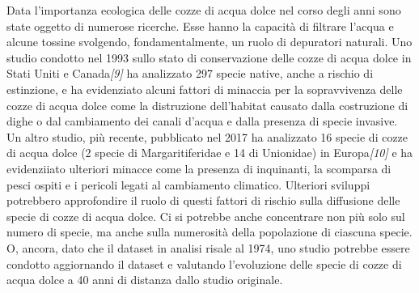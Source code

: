 \documentclass{article} %
\begin{document}
Data l'importanza ecologica delle cozze di acqua dolce nel corso degli anni sono state oggetto di numerose ricerche.
Esse hanno la capacità di filtrare l'acqua e alcune tossine svolgendo, fondamentalmente, un ruolo di depuratori naturali.
Uno studio condotto nel 1993 sullo stato di conservazione delle cozze di acqua dolce in Stati Uniti e Canada\textit{[9]} ha analizzato 297 specie native, anche a rischio di estinzione, e ha evidenziato alcuni fattori di minaccia per la sopravvivenza delle cozze di acqua dolce come la distruzione dell'habitat causato dalla costruzione di dighe o dal cambiamento dei canali d'acqua e dalla presenza di specie invasive.
Un altro studio, più recente, pubblicato nel 2017 ha analizzato 16 specie di cozze di acqua dolce (2 specie di Margaritiferidae e 14 di Unionidae) in Europa\textit{[10]} e ha evidenziiato ulteriori minacce come la presenza di inquinanti, la scomparsa di pesci ospiti e i pericoli legati al cambiamento climatico. 
Ulteriori sviluppi potrebbero approfondire il ruolo di questi fattori di rischio sulla diffusione delle specie di cozze di acqua dolce. Ci si potrebbe anche concentrare non più solo sul numero di specie, ma anche sulla numerosità della popolazione di ciascuna specie.
O, ancora, dato che il dataset in analisi risale al 1974, uno studio potrebbe essere condotto aggiornando il dataset e valutando l'evoluzione delle specie di cozze di acqua dolce a 40 anni di distanza dallo studio originale.
\end{document}
